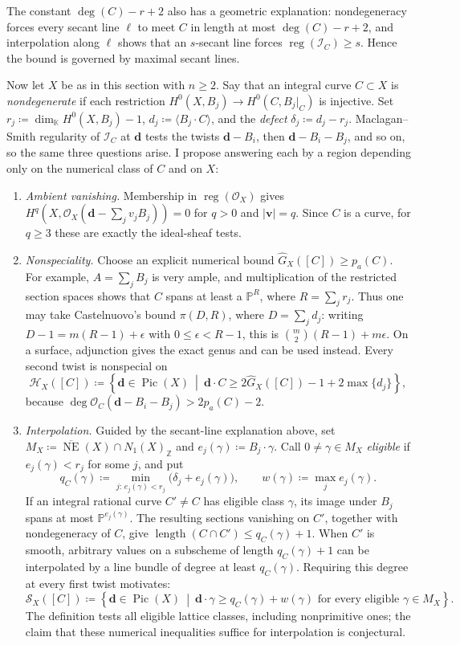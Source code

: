 \documentclass[11pt,reqno]{amsart}
\theoremstyle{remark}
\newcommand{\reg}{\operatorname{reg}}
\newcommand{\length}{\operatorname{length}}
\newcommand{\Pic}{\operatorname{Pic}}
\newcommand{\dd}{\mathbf{d}}
\newcommand{\vv}{\mathbf{v}}
\newcommand{\KK}{\mathbb{K}}
\newcommand{\PP}{\mathbb{P}}
\newcommand{\ZZ}{\mathbb{Z}}
\newcommand{\cH}{\mathcal{H}}
\newcommand{\cI}{\mathcal{I}}
\newcommand{\cO}{\mathcal{O}}
\newcommand{\cS}{\mathcal{S}}
\begin{document}
The constant $\deg(C)-r+2$ also has a geometric explanation: nondegeneracy forces every secant line $\ell$ to meet $C$ in length at most $\deg(C)-r+2$, and interpolation along $\ell$ shows that an $s$-secant line forces $\reg(\cI_{C})\geq s$. Hence the bound is governed by maximal secant lines. 

Now let $X$ be as in this section with $n\geq2$. Say that an integral curve $C\subset X$ is \emph{nondegenerate} if each restriction $H^0(X,B_j)\to H^0(C,B_j|_C)$ is injective. Set $r_j\coloneqq\dim_\KK H^0(X,B_j)-1$, $d_j\coloneqq\langle B_j\cdot C\rangle$, and the \emph{defect} $\delta_j\coloneqq d_j-r_j$. Maclagan--Smith regularity of $\cI_C$ at $\dd$ tests the twists $\dd-B_i$, then $\dd-B_i-B_j$, and so on, so the same three questions arise. I propose answering each by a region depending only on the numerical class of $C$ and on $X$:
\begin{enumerate}[wide, labelwidth=!, labelindent=0pt]

\item \emph{Ambient vanishing.} Membership in $\reg(\cO_X)$ gives $H^q(X,\cO_X(\dd-\sum_jv_jB_j))=0$ for $q>0$ and $|\vv|=q$. Since $C$ is a curve, for $q\geq3$ these are exactly the ideal-sheaf tests.

\item \emph{Nonspeciality.} Choose an explicit numerical bound $\widehat G_X([C])\geq p_a(C)$. For example, $A=\sum_jB_j$ is very ample, and multiplication of the restricted section spaces shows that $C$ spans at least a $\PP^R$, where $R=\sum_jr_j$. Thus one may take Castelnuovo's bound $\pi(D,R)$, where $D=\sum_jd_j$: writing $D-1=m(R-1)+\epsilon$ with $0\leq\epsilon<R-1$, this is $\binom{m}{2}(R-1)+m\epsilon$. On a surface, adjunction gives the exact genus and can be used instead. Every second twist is nonspecial on
\[
\cH_X([C])\coloneqq
\left\{\dd\in\Pic(X)\ \middle|\
\dd\cdot C\geq2\widehat G_X([C])-1+2\max\{d_j\}\right\},
\]
because $\deg\cO_C(\dd-B_i-B_j)>2p_a(C)-2$.

\item \emph{Interpolation.} Guided by the secant-line explanation above, set $M_X\coloneqq\overline{\operatorname{NE}}(X)\cap N_1(X)_{\ZZ}$ and $e_j(\gamma)\coloneqq B_j\cdot\gamma$. Call $0\neq\gamma\in M_X$ \emph{eligible} if $e_j(\gamma)<r_j$ for some $j$, and put
\[
q_C(\gamma)\coloneqq\min_{j:\,e_j(\gamma)<r_j}
\bigl(\delta_j+e_j(\gamma)\bigr),
\qquad w(\gamma)\coloneqq\max_je_j(\gamma).
\]
If an integral rational curve $C'\neq C$ has eligible class $\gamma$, its image under $B_j$ spans at most $\PP^{e_j(\gamma)}$. The resulting sections vanishing on $C'$, together with nondegeneracy of $C$, give $\length(C\cap C')\leq q_C(\gamma)+1$. When $C'$ is smooth, arbitrary values on a subscheme of length $q_C(\gamma)+1$ can be interpolated by a line bundle of degree at least $q_C(\gamma)$. Requiring this degree at every first twist motivates:
\[
\cS_X([C])\coloneqq
\left\{\dd\in\Pic(X)\ \middle|\
\dd\cdot\gamma\geq q_C(\gamma)+w(\gamma)
\text{ for every eligible }\gamma\in M_X\right\}.
\]
The definition tests all eligible lattice classes, including nonprimitive ones; the claim that these numerical inequalities suffice for interpolation is conjectural.
\end{enumerate}
\end{document}
